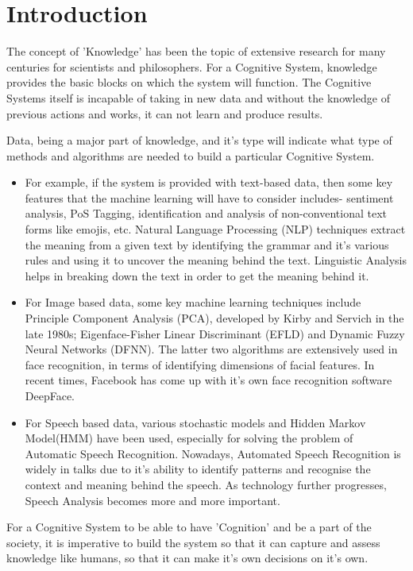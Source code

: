 \section{Introduction}\label{introduction}


The concept of 'Knowledge' has been the topic of extensive research for many
centuries for scientists and philosophers. For a Cognitive System, knowledge
provides the basic blocks on which the system will function. The Cognitive
Systems itself is incapable of taking in new data and without the knowledge of
previous actions and works, it can not learn and produce results.

Data, being a major part of knowledge, and it's type will indicate what type of
methods and algorithms are needed to build a particular Cognitive System.

\begin{itemize}
	\item For example, if the system is provided with text-based data, then some key
	      features that the machine learning will have to consider includes- sentiment
	      analysis, PoS Tagging, identification and analysis of non-conventional text
	      forms like emojis, etc. Natural Language Processing (NLP) techniques extract
	      the meaning from a given text by identifying the grammar and it's various rules
	      and using it to uncover the meaning behind the text. Linguistic Analysis helps
	      in breaking down the text in order to get the meaning behind it.
\end{itemize}

\begin{itemize}
	\item For Image based data, some key machine learning techniques include Principle
	      Component Analysis (PCA), developed by Kirby and Servich in the late 1980s;
	      Eigenface-Fisher Linear Discriminant (EFLD) and Dynamic Fuzzy Neural Networks
	      (DFNN). The latter two algorithms are extensively used in face recognition, in
	      terms of identifying dimensions of facial features. In recent times, Facebook
	      has come up with it's own face recognition software DeepFace.
\end{itemize}

\begin{itemize}
	\item For Speech based data, various stochastic models and Hidden Markov Model(HMM)
	      have been used, especially for solving the problem of Automatic Speech
	      Recognition. Nowadays, Automated Speech Recognition is widely in talks due to
	      it's ability to identify patterns and recognise the context and meaning behind
	      the speech. As technology further progresses, Speech Analysis becomes more and
	      more important.
\end{itemize}
For a Cognitive System to be able to have 'Cognition' and be a part of the society, it is imperative to build the system so that it can capture and assess knowledge like humans, so that it can make it's own decisions on it's own.

